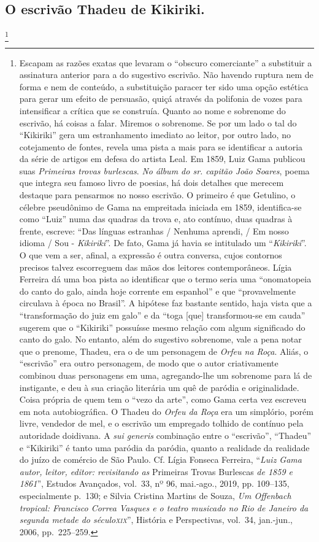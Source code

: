 {\subsection{O escrivão Thadeu de Kikiriki.}\footnote{ Escapam as razões exatas que
  levaram o ``obscuro comerciante'' a substituir a assinatura anterior
  para a do sugestivo escrivão. Não havendo ruptura nem de forma e nem
  de conteúdo, a substituição paracer ter sido uma opção estética para
  gerar um efeito de persuasão, quiçá através da polifonia de vozes para
  intensificar a crítica que se construía. Quanto ao nome e sobrenome do
  escrivão, há coisas a falar. Miremos o sobrenome. Se por um lado o tal
  do ``Kikiriki'' gera um estranhamento imediato ao leitor, por outro
  lado, no cotejamento de fontes, revela uma pista a mais para se
  identificar a autoria da série de artigos em defesa do artista Leal.
  Em 1859, Luiz Gama publicou suas \emph{Primeiras trovas burlescas}.
  \emph{No álbum do sr. capitão João Soares}, poema que integra seu
  famoso livro de poesias, há dois detalhes que merecem destaque para
  pensarmos no nosso escrivão. O primeiro é que Getulino, o célebre
  pseudônimo de Gama na empreitada iniciada em 1859, identifica-se como
  ``Luiz'' numa das quadras da trova e, ato contínuo, duas quadras à
  frente, escreve: ``Das línguas estranhas / Nenhuma aprendi, / Em nosso
  idioma / Sou - \emph{Kikiriki}''. De fato, Gama já havia se intitulado
  um ``\emph{Kikiriki}''. O que vem a ser, afinal, a expressão é outra
  conversa, cujos contornos precisos talvez escorreguem das mãos dos
  leitores contemporâneos. Lígia Ferreira dá uma boa pista ao
  identificar que o termo seria uma ``onomatopeia do canto do galo, ainda
  hoje corrente em espanhol'' e que ``provavelmente circulava à época no
  Brasil''. A hipótese faz bastante sentido, haja vista que a
  ``transformação do juiz em galo'' e da ``toga {[}que{]} transformou-se em
  cauda'' sugerem que o ``Kikiriki'' possuísse mesmo relação com algum
  significado do canto do galo. No entanto, além do sugestivo sobrenome,
  vale a pena notar que o prenome, Thadeu, era o de um personagem de
  \emph{Orfeu na Roça}. Aliás, o ``escrivão'' era outro personagem, de
  modo que o autor criativamente combinou duas personagens em uma,
  agregando-lhe um sobrenome para lá de instigante, e deu à sua criação
  literária um quê de paródia e originalidade. Coisa própria de quem tem
  o ``vezo da arte'', como Gama certa vez escreveu em nota autobiográfica.
  O Thadeu do \emph{Orfeu da Roça} era um simplório, porém livre,
  vendedor de mel, e o escrivão um empregado tolhido de contínuo pela
  autoridade doidivana. A \emph{sui generis} combinação entre o
  ``escrivão'', ``Thadeu'' e ``Kikiriki'' é tanto uma paródia da paródia,
  quanto a realidade da realidade do juízo de comércio de São Paulo. Cf.
  Lígia Fonseca Ferreira, ``\emph{Luiz Gama autor, leitor, editor:
  revisitando as} Primeiras Trovas Burlescas \emph{de 1859 e 1861}'',
  Estudos Avançados, vol.~33, nº 96, mai.-ago., 2019, pp. 109--135,
  especialmente p.~130; e Silvia Cristina Martins de Souza, \emph{Um
  Offenbach tropical: Francisco Correa Vasques e o teatro musicado no
  Rio de Janeiro da segunda metade do século\textsc{xix}}'', História e
  Perspectivas, vol.~34, jan.-jun., 2006, pp.~225--259.}

}
